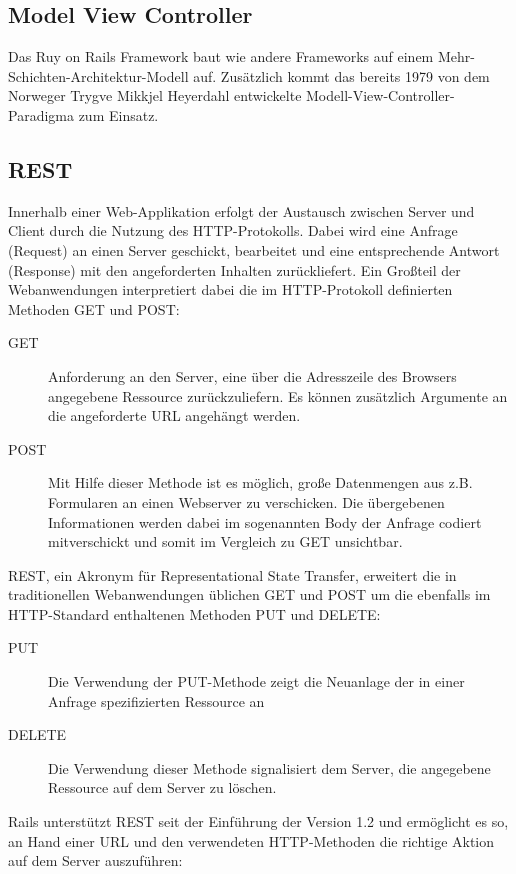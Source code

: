 \subsection{Model View Controller}
Das Ruy on Rails Framework baut wie andere Frameworks auf einem Mehr-Schichten-Architektur-Modell auf. Zusätzlich kommt das bereits 1979 von dem Norweger Trygve Mikkjel Heyerdahl entwickelte Modell-View-Controller-Paradigma zum Einsatz.



\subsection{REST}
Innerhalb einer Web-Applikation erfolgt der Austausch zwischen Server und Client durch die Nutzung des HTTP-Protokolls. Dabei wird eine Anfrage (Request) an einen Server geschickt, bearbeitet und eine entsprechende Antwort (Response) mit den angeforderten Inhalten zurückliefert. Ein Großteil der Webanwendungen interpretiert dabei die im HTTP-Protokoll definierten Methoden GET und POST:

\begin{description}
\item[GET]
	Anforderung an den Server, eine über die Adresszeile des Browsers angegebene Ressource zurückzuliefern. Es können zusätzlich Argumente an die angeforderte URL angehängt werden.
\item[POST]
	Mit Hilfe dieser Methode ist es möglich,  große Datenmengen aus z.B. Formularen an einen Webserver zu verschicken. Die übergebenen Informationen werden dabei im sogenannten Body der Anfrage codiert mitverschickt und somit im Vergleich zu GET unsichtbar.
\end{description}


REST, ein Akronym für Representational State Transfer, erweitert die in  traditionellen Webanwendungen üblichen GET und POST um die ebenfalls im HTTP-Standard enthaltenen Methoden PUT und DELETE:

\begin{description}
\item[PUT]
	Die Verwendung der PUT-Methode zeigt die Neuanlage der in einer	Anfrage spezifizierten Ressource an
\item[DELETE]
	Die Verwendung dieser Methode signalisiert dem Server, die angegebene Ressource auf dem Server zu löschen.
\end{description}


Rails unterstützt REST seit der Einführung der Version 1.2 und ermöglicht es so, an Hand einer URL und den verwendeten HTTP-Methoden die richtige Aktion auf dem Server auszuführen:

